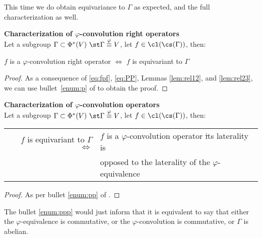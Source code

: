 This time we do obtain equivariance to $\Gamma$ as expected, and the full characterization as well.

\begin{theorem}\textbf{Characterization of $\varphi$-convolution right operators}\\
Let a subgroup $\Gamma \subset \Phi^*(V)~\st \Gamma \overset{\varphi}{\equiv} V$, let $f \in \cl(\cs(\Gamma))$, then:\\
\centerline{$f$ is a $\varphi$-convolution right operator $\Leftrightarrow$ $f$ is equivariant to $\Gamma$}
\label{prop:equiG}
\end{theorem}
\begin{proof}
As a consequence of \eqref{eq:fpf}, \eqref{eq:PP}, Lemmas \ref{lem:rel12}, and \ref{lem:rel23}, we can use bullet~\ref{enum:p} of  to obtain the proof.
\end{proof}

\begin{corollary}\textbf{Characterization of $\varphi$-convolution operators}\\
Let a subgroup $\Gamma \subset \Phi^*(V)~\st \Gamma \overset{\varphi}{\equiv} V$, let $f \in \cl(\cs(\Gamma))$, then:\\
\begin{tabular}{rl}
  $f$ is equivariant to $\Gamma$ $\Leftrightarrow$ &
  $f$ is a $\varphi$-convolution operator \st its laterality is \\
  & opposed to the laterality of the $\varphi$-equivalence
\end{tabular}
\label{cor:equiG}
\end{corollary}
\begin{proof}
As per bullet \ref{enum:pp} of .
\end{proof}

\begin{remark}
The bullet \ref{enum:ppp} would just inform that it is equivalent to say that either the $\varphi$-equivalence is commutative, or the $\varphi$-convolution is commutative, or $\Gamma$ is abelian.
\end{remark}


